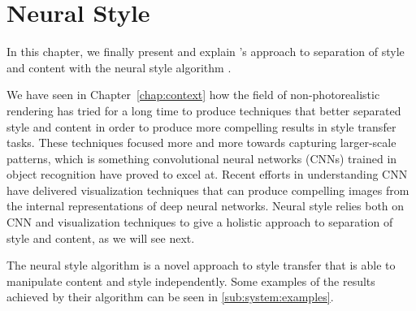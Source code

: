 
\chapter{Neural Style}
\label{chap:system}




In this chapter, we finally present and explain \citeauthor{Gatys2015B}'s approach to separation of style and content with the neural style algorithm \cite{Gatys2015B}.

We have seen in Chapter~\ref{chap:context} how the field of non-photorealistic rendering has tried for a long time to produce techniques that better separated style and content in order to produce more compelling results in style transfer tasks.
These techniques focused more and more towards capturing larger-scale patterns, which is something convolutional neural networks (CNNs) trained in object recognition have proved to excel at.
Recent efforts in understanding CNN have delivered visualization techniques that can produce compelling images from the internal representations of deep neural networks.
Neural style relies both on CNN and visualization techniques to give a holistic approach to separation of style and content, as we will see next.

The neural style algorithm is a novel approach to style transfer that is able to manipulate content and style independently.
Some examples of the results achieved by their algorithm can be seen in \autoref{sub:system:examples}.

